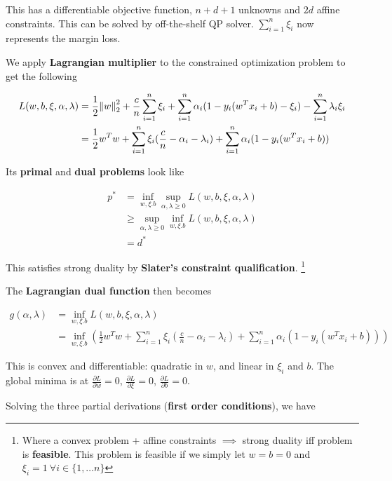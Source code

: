 \documentclass{article}
\DeclareMathOperator*{\minf}{inf}
\DeclareMathOperator*{\msup}{sup}
\begin{document}
This has a differentiable objective function, $n + d + 1$ unknowns and $2 d$ affine constraints.
This can be solved by off-the-shelf QP solver.
$\sum_{i = 1}^{n}{\xi_i}$ now represents the margin loss.

We apply \textbf{Lagrangian multiplier} to the constrained optimization problem to get the following

\begin{align*}
L(w, b, \xi, \alpha, \lambda) &= \frac{1}{2} {\norm{w}_2^2} + \frac{c}{n} \sum_{i = 1}^{n}{\xi_i} + \sum_{i = 1}^{n}{\alpha_i (1 - y_i (w^{T} x_i + b) - \xi_i)} - \sum_{i = 1}^{n}{\lambda_i \xi_i} \\
                              &= \frac{1}{2} w^{T} w + \sum_{i = 1}^{n}{\xi_i (\frac{c}{n} - \alpha_i - \lambda_i)} + \sum_{i = 1}^{n}{\alpha_i (1 - y_i (w^{T} x_i + b))}
\end{align*}

Its \textbf{primal} and \textbf{dual problems} look like

\begin{align*}
p^* &= \minf_{w, \xi. b} \msup_{\alpha, \lambda \geq 0} L(w, b, \xi, \alpha, \lambda) \\
    &\geq \msup_{\alpha, \lambda \geq 0} \minf_{w, \xi. b} L(w, b, \xi, \alpha, \lambda) \\
    &= d^*
\end{align*}

This satisfies strong duality by \textbf{Slater's constraint qualification}.
\footnote{Where a convex problem + affine constraints $\implies$ strong duality iff problem is \textbf{feasible}.
This problem is feasible if we simply let $w = b = 0$ and $\xi_i = 1 ~ \forall i \in \{1, \dots n\}$}

The \textbf{Lagrangian dual function} then becomes

\begin{align*}
g(\alpha, \lambda) &= \minf_{w, \xi. b} L(w, b, \xi, \alpha, \lambda) \\
                   &= \minf_{w, \xi. b} (\frac{1}{2} w^{T} w + \sum_{i = 1}^{n}{\xi_i (\frac{c}{n} - \alpha_i - \lambda_i)} + \sum_{i = 1}^{n}{\alpha_i (1 - y_i (w^{T} x_i + b))})
\end{align*}

This is convex and differentiable: quadratic in $w$, and linear in $\xi_i$ and $b$.
The global minima is at $\frac{\partial L}{\partial w} = 0$, $\frac{\partial L}{\partial \xi} = 0$, $\frac{\partial L}{\partial b} = 0$.

Solving the three partial derivations (\textbf{first order conditions}), we have
\end{document}

